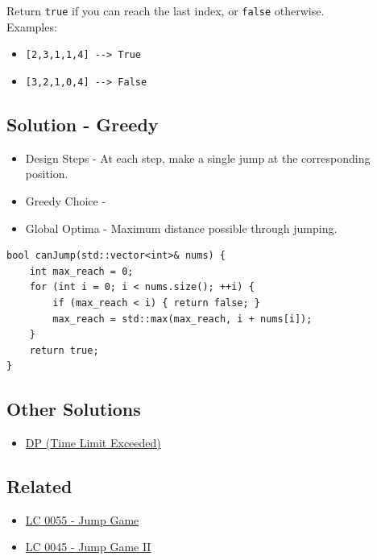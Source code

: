 Return {\colorbox{CodeBackground}{\lstinline|true|}} if you can reach the last index, or {\colorbox{CodeBackground}{\lstinline|false|}} otherwise.\\

Examples:
\begin{itemize}
	\item {\colorbox{CodeBackground}{\lstinline|[2,3,1,1,4] --> True|}}
	\item {\colorbox{CodeBackground}{\lstinline|[3,2,1,0,4] --> False|}}
\end{itemize}

\subsection*{Solution - Greedy}\label{solution:lc0055_greedy}
\begin{itemize}
	\item Design Steps - At each step, make a single jump at the corresponding position.
	\item Greedy Choice - {\color{magenta}{At each step, jump to the furthest possible distance.}}
	\item Global Optima - Maximum distance possible through jumping.
\end{itemize}
\begin{lstlisting}
bool canJump(std::vector<int>& nums) {
	int max_reach = 0;
	for (int i = 0; i < nums.size(); ++i) {
		if (max_reach < i) { return false; }
		max_reach = std::max(max_reach, i + nums[i]);
	}
	return true;
}
\end{lstlisting}

\subsection*{Other Solutions}
\begin{itemize}
	\item \hyperref[solution:lc0055_dp]{DP (Time Limit Exceeded)}
\end{itemize}

\subsection*{Related}
\begin{itemize}
	\item \hyperref[lc0055]{LC 0055 - Jump Game}
	\item \hyperref[lc0045]{LC 0045 - Jump Game II}
\end{itemize}

